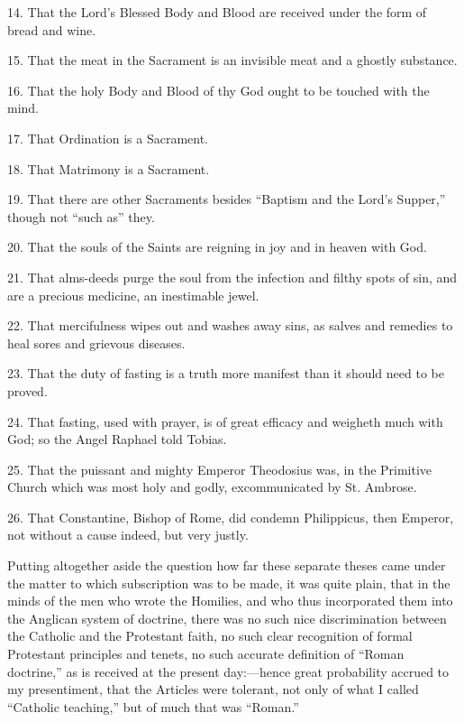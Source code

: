 14. That the Lord's Blessed Body and Blood are received under the
form of bread and wine.

15. That the meat in the Sacrament is an invisible meat and a ghostly
substance.

16. That the holy Body and Blood of thy God ought to be
touched with the mind.

17. That Ordination is a Sacrament.

18. That Matrimony is a Sacrament.

19. That there are other Sacraments besides ``Baptism and the
Lord's Supper,'' though not ``such as'' they.

20. That the souls of the Saints are reigning in joy and in heaven
with God.

21. That alms-deeds purge the soul from the infection and filthy
spots of sin, and are a precious medicine, an inestimable jewel.

22. That mercifulness wipes out and washes away sins, as salves and remedies to heal sores and grievous
diseases.

23. That the duty of fasting is a truth more manifest than it should
need to be proved.

24. That fasting, used with prayer, is of great efficacy and weigheth
much with God; so the Angel Raphael told Tobias.

25. That the puissant and mighty Emperor Theodosius was, in the
Primitive Church which was most holy and godly, excommunicated by St.
Ambrose.

26. That Constantine, Bishop of Rome, did condemn Philippicus, then Emperor, not without a cause indeed, but
very
justly.

Putting altogether aside the question how far these separate theses
came under the matter to which subscription was to be made, it was quite
plain, that in the minds of the men who wrote the Homilies, and
who thus incorporated them into the Anglican system of doctrine, there
was no such nice discrimination between the
Catholic and the Protestant faith, no such clear recognition of formal Protestant principles and tenets,
no such accurate definition of ``Roman doctrine,'' as is received at
the present day:—hence great probability accrued to
my presentiment, that the Articles were tolerant, not only of what I
called ``Catholic teaching,'' but of much that was
``Roman.''


